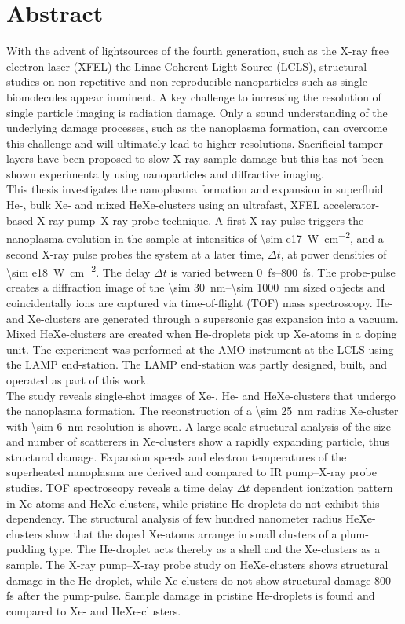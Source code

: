 \section*{Abstract}\label{ch:abstract}
With the advent of lightsources of the fourth generation, such as the X-ray free electron laser (XFEL) the Linac Coherent Light Source (LCLS), structural studies on non-repetitive and non-reproducible nanoparticles such as single biomolecules appear imminent. A key challenge to increasing the resolution of single particle imaging is radiation damage. Only a sound understanding of the underlying damage processes, such as the nanoplasma formation, can overcome this challenge and will ultimately lead to higher resolutions. Sacrificial tamper layers have been proposed to slow X-ray sample damage but this has not been shown experimentally using nanoparticles and diffractive imaging.\\[0.5\baselineskip]
%
This thesis investigates the nanoplasma formation and expansion in superfluid He-, bulk Xe- and mixed HeXe-clusters using an ultrafast, XFEL accelerator-based X-ray pump--X-ray probe technique. A first X-ray pulse triggers the nanoplasma evolution in the sample at intensities of \SI{\sim e17}{\watt\per\square\centi\meter}, and a second X-ray pulse probes the system at a later time, $\Delta t$, at power densities of \SI{\sim e18}{\watt\per\square\centi\meter}. The delay $\Delta t$ is varied between \SIrange{0}{800}{\femto\second}. The probe-pulse creates a diffraction image of the \SIrange{\sim 30}{\sim 1000}{\nano\meter} sized objects and coincidentally ions are captured via time-of-flight (TOF) mass spectroscopy. He- and Xe-clusters are generated through a supersonic gas expansion into a vacuum. Mixed HeXe-clusters are created when He-droplets pick up Xe-atoms in a doping unit. The experiment was performed at the AMO instrument at the LCLS using the LAMP end-station. The LAMP end-station was partly designed, built, and operated as part of this work.\\[0.5\baselineskip]
%
The study reveals single-shot images of Xe-, He- and HeXe-clusters that undergo the nanoplasma formation. The reconstruction of a \SI{\sim 25}{\nano\meter} radius Xe-cluster with \SI{\sim 6}{\nano\meter} resolution is shown. A large-scale structural analysis of the size and number of scatterers in Xe-clusters show a rapidly expanding particle, thus structural damage. Expansion speeds and electron temperatures of the superheated nanoplasma are derived and compared to IR pump--X-ray probe studies. TOF spectroscopy reveals a time delay $\Delta t$ dependent ionization pattern in Xe-atoms and HeXe-clusters, while pristine He-droplets do not exhibit this dependency. The structural analysis of few hundred nanometer radius HeXe-clusters show that the doped Xe-atoms arrange in small clusters of a plum-pudding type. The He-droplet acts thereby as a shell and the Xe-clusters as a sample. The X-ray pump--X-ray probe study on HeXe-clusters shows structural damage in the He-droplet, while Xe-clusters do not show structural damage 800 fs after the pump-pulse. Sample damage in pristine He-droplets is found and compared to Xe- and HeXe-clusters.
%
%
%
%